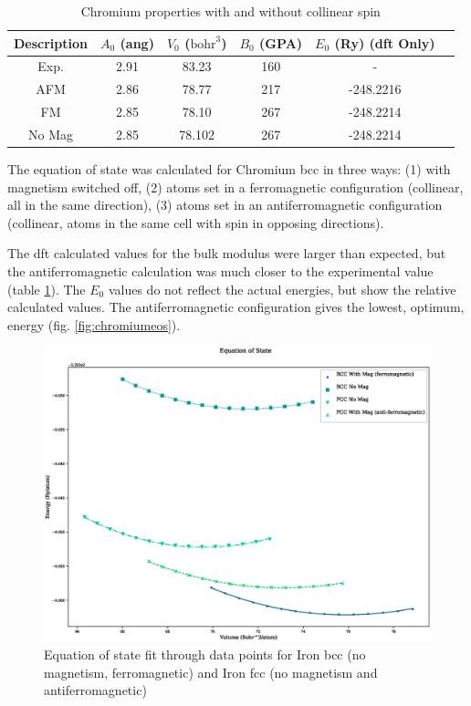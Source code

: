 \FloatBarrier
\begin{table}[h]
\begin{center}
\renewcommand{\arraystretch}{1.2}
\begin{tabular}{c c c c c c}
\hline\hline
Description & $A_0$ (ang) & $V_0$ ($\text{bohr}^3$) & $B_0$ (GPA) & $E_0$ (Ry) (\acrshort{dft} Only) \\
\hline\hline
Exp. & 2.91 & 83.23 & 160 & - \\
AFM & 2.86 & 78.77 & 217 & -248.2216 \\
FM & 2.85 & 78.10 & 267 & -248.2214 \\
No Mag & 2.85 & 78.102 & 267 & -248.2214 \\
\hline\hline
\end{tabular}
\end{center}
\caption{Chromium properties with and without collinear spin}
\label{table:crproperties}
\end{table}
\FloatBarrier

The equation of state was calculated for Chromium \acrshort{bcc} in three ways: (1) with magnetism switched off, (2) atoms set in a ferromagnetic configuration (collinear, all in the same direction), (3) atoms set in an antiferromagnetic configuration (collinear, atoms in the same cell with spin in opposing directions).  

The \acrshort{dft} calculated values for the bulk modulus were larger than expected, but the antiferromagnetic calculation was much closer to the experimental value (table \ref{table:crproperties}).  The $E_0$ values do not reflect the actual energies, but show the relative calculated values.  The antiferromagnetic configuration gives the lowest, optimum, energy (fig. \ref{fig:chromiumeos}).

\FloatBarrier
\begin{figure}[h]
\begin{center}
\includegraphics[scale=0.45]{chapters/potentials_fe_pd_ru/qeeos_plots/fe-mag/iron_eos_comparison.eps}
\caption{Equation of state fit through data points for Iron \acrshort{bcc} (no magnetism, ferromagnetic) and Iron \acrshort{fcc} (no magnetism and antiferromagnetic)}
\label{fig:iron_bcc_fcc_eos}
\end{center}
\end{figure}
\FloatBarrier


